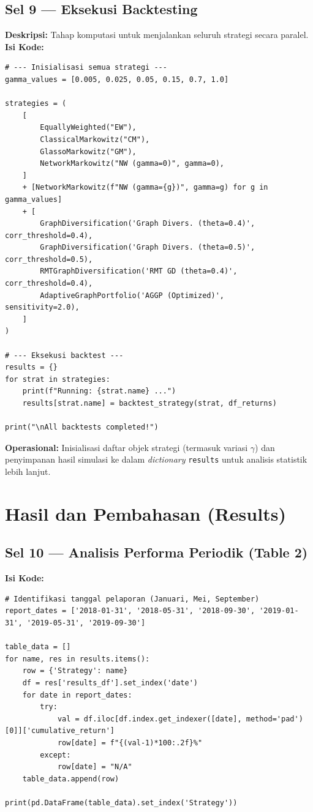 \documentclass[12pt, a4paper]{article}
\begin{document}
\subsection{Sel 9 — Eksekusi Backtesting}
\textbf{Deskripsi:} Tahap komputasi untuk menjalankan seluruh strategi secara paralel.
\textbf{Isi Kode:}
\begin{lstlisting}
# --- Inisialisasi semua strategi ---
gamma_values = [0.005, 0.025, 0.05, 0.15, 0.7, 1.0]

strategies = (
    [
        EquallyWeighted("EW"),
        ClassicalMarkowitz("CM"),
        GlassoMarkowitz("GM"),
        NetworkMarkowitz("NW (gamma=0)", gamma=0),
    ]
    + [NetworkMarkowitz(f"NW (gamma={g})", gamma=g) for g in gamma_values]
    + [
        GraphDiversification('Graph Divers. (theta=0.4)', corr_threshold=0.4),
        GraphDiversification('Graph Divers. (theta=0.5)', corr_threshold=0.5),
        RMTGraphDiversification('RMT GD (theta=0.4)',     corr_threshold=0.4),
        AdaptiveGraphPortfolio('AGGP (Optimized)',         sensitivity=2.0),
    ]
)

# --- Eksekusi backtest ---
results = {}
for strat in strategies:
    print(f"Running: {strat.name} ...")
    results[strat.name] = backtest_strategy(strat, df_returns)

print("\nAll backtests completed!")
\end{lstlisting}
\textbf{Operasional:} Inisialisasi daftar objek strategi (termasuk variasi $\gamma$) dan penyimpanan hasil simulasi ke dalam \textit{dictionary} \texttt{results} untuk analisis statistik lebih lanjut.

\section{Hasil dan Pembahasan (Results)}

\subsection{Sel 10 — Analisis Performa Periodik (Table 2)}
\textbf{Isi Kode:}
\begin{lstlisting}
# Identifikasi tanggal pelaporan (Januari, Mei, September)
report_dates = ['2018-01-31', '2018-05-31', '2018-09-30', '2019-01-31', '2019-05-31', '2019-09-30']

table_data = []
for name, res in results.items():
    row = {'Strategy': name}
    df = res['results_df'].set_index('date')
    for date in report_dates:
        try:
            val = df.iloc[df.index.get_indexer([date], method='pad')[0]]['cumulative_return']
            row[date] = f"{(val-1)*100:.2f}%"
        except:
            row[date] = "N/A"
    table_data.append(row)

print(pd.DataFrame(table_data).set_index('Strategy'))
\end{lstlisting}
\end{document}
